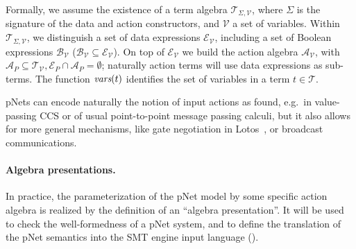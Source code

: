 \documentclass{lncs/llncs}
\newcommand{\cT}{\ensuremath{\mathcal{T}}}
\newcommand{\cV}{\ensuremath{\mathcal{V}}}
\newcommand{\signature}{\ensuremath{\Sigma}}
\newcommand{\variables}{\ensuremath{\cV}}
\newcommand{\Talg}{\ensuremath{\cT_{\signature,\variables}}}
\def\AlgT{\mathcal{T}}
\newcommand{\eg}[1][\ ]{e.g.#1}
\begin{document}
\renewcommand{\P}{\mathcal V}
\def\Talg{\mathcal{T}_{\Sigma,\P}}
Formally, we assume the existence of a term algebra $\Talg$,
where $\Sigma$ is the signature of the data and action constructors,
and $\P$ a set of variables. Within $\Talg$, we distinguish a set of
data expressions $\mathcal{E}_\P$, including a set of Boolean
expressions $\mathcal{B}_{\P}$ ($\mathcal{B}_{\P}\subseteq\mathcal{E}_\P$).
On top of $\mathcal{E}_\P$ we build the action algebra
$\mathcal{A}_\P$, with $\mathcal{A}_P\subseteq\mathcal{T}_\P,
\mathcal{E}_P\cap\mathcal{A}_P=\emptyset$;
naturally action terms will use data expressions as sub-terms.
The function $\vars(t)$ identifies the set of variables in a term
$t\in\AlgT$.

pNets can encode naturally the notion of input actions as found,
\eg in value-passing CCS 
\cite{Milner89} or of usual point-to-point message passing calculi,
but it also allows 
for more general mechanisms, like gate negotiation in Lotos~\cite{LotosISO89}, or broadcast
communications.

\paragraph*{Algebra presentations.}
In practice, the parameterization of the pNet model by some specific
action algebra is realized by the definition of an ``algebra
presentation''. It will be used to check the
well-formedness of a pNet system, and to define the translation of the pNet
semantics into the SMT engine input language (\cite{BarFT-RR-17}).
\end{document}
